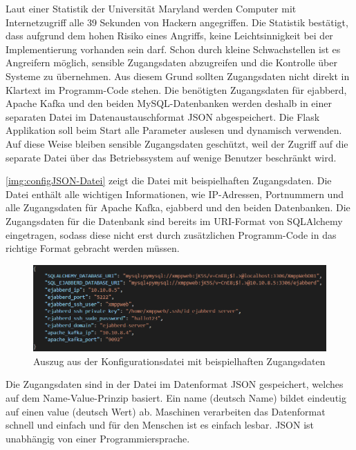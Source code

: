\documentclass[a4paper,titlepage,halfparskip,12pt]{scrreprt}
\begin{document}
\begin{onehalfspacing}
Laut einer Statistik der Universität Maryland \cite{securityStatisticWebSites} werden Computer mit Internetzugriff alle 39 Sekunden von Hackern angegriffen. Die Statistik bestätigt, dass aufgrund dem hohen Risiko eines Angriffs, keine Leichtsinnigkeit bei der Implementierung vorhanden sein darf. Schon durch kleine Schwachstellen ist es Angreifern möglich, sensible Zugangsdaten abzugreifen und die Kontrolle über Systeme zu übernehmen. Aus diesem Grund sollten Zugangsdaten nicht direkt in Klartext im Programm-Code stehen. Die benötigten Zugangsdaten für ejabberd, Apache Kafka und den beiden MySQL-Datenbanken werden deshalb in einer separaten Datei im Datenaustauschformat \acs{JSON} abgespeichert. Die Flask Applikation soll beim Start alle Parameter auslesen und dynamisch verwenden. Auf diese Weise bleiben sensible Zugangsdaten geschützt, weil der Zugriff auf die separate Datei über das Betriebssystem auf wenige Benutzer beschränkt wird.

\autoref{img:configJSON-Datei} zeigt die Datei mit beispielhaften Zugangsdaten. Die Datei enthält alle wichtigen Informationen, wie IP-Adressen, Portnummern und alle Zugangsdaten für Apache Kafka, ejabberd und den beiden Datenbanken. Die Zugangsdaten für die Datenbank sind bereits im \acs{URI}-Format von SQLAlchemy eingetragen, sodass diese nicht erst durch zusätzlichen Programm-Code in das richtige Format gebracht werden müssen.

\begin{figure}[h]
	\centering
	\includegraphics[width=\linewidth]{images/configJSON-Datei}
	\caption{Auszug aus der Konfigurationsdatei mit beispielhaften Zugangsdaten}
	\label{img:configJSON-Datei}
\end{figure}

Die Zugangsdaten sind in der Datei im Datenformat \ac{JSON} gespeichert, welches auf dem Name-Value-Prinzip basiert. Ein name (deutsch Name) bildet eindeutig auf einen value (deutsch Wert) ab. Maschinen verarbeiten das Datenformat schnell und einfach und für den Menschen ist es einfach lesbar. \ac{JSON} ist unabhängig von einer Programmiersprache.\cite{jsonIntroduction}


\end{onehalfspacing}
\end{document}
